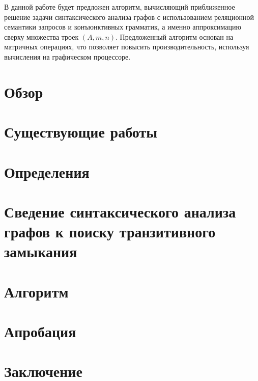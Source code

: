 \documentclass [a4paper] {article}
\begin{document}
	В данной работе будет предложен алгоритм, вычисляющий приближенное решение задачи синтаксического анализа графов с использованием реляционной семантики запросов и конъюнктивных грамматик, а именно аппроксимацию сверху множества троек $(A, m, n)$. Предложенный алгоритм основан на матричных операциях, что позволяет повысить производительность, используя вычисления на графическом процессоре.
	\section{Обзор}
	\section{Существующие работы}
	\section{Определения}
	\section{Сведение синтаксического анализа графов к поиску транзитивного замыкания}
	\section{Алгоритм}
	\section{Апробация}
	\section{Заключение}
	
	
	\printbibliography
	
\end{document}
